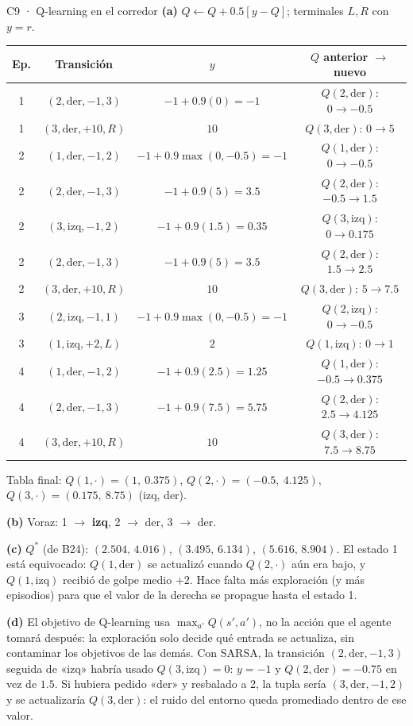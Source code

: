 \begin{solucion}{C9 · Q-learning en el corredor}
\textbf{(a)} $Q\leftarrow Q+0.5[y-Q]$; terminales $L,R$ con $y=r$.
\begin{center}\small
\begin{tabular}{c|c|c|c}
Ep. & Transición & $y$ & $Q$ anterior $\to$ nuevo\\\hline
1 & $(2,\text{der},-1,3)$ & $-1+0.9(0)=-1$ & $Q(2,\text{der})$: $0\to-0.5$\\
1 & $(3,\text{der},+10,R)$ & $10$ & $Q(3,\text{der})$: $0\to5$\\
2 & $(1,\text{der},-1,2)$ & $-1+0.9\max(0,-0.5)=-1$ & $Q(1,\text{der})$: $0\to-0.5$\\
2 & $(2,\text{der},-1,3)$ & $-1+0.9(5)=3.5$ & $Q(2,\text{der})$: $-0.5\to1.5$\\
2 & $(3,\text{izq},-1,2)$ & $-1+0.9(1.5)=0.35$ & $Q(3,\text{izq})$: $0\to0.175$\\
2 & $(2,\text{der},-1,3)$ & $-1+0.9(5)=3.5$ & $Q(2,\text{der})$: $1.5\to2.5$\\
2 & $(3,\text{der},+10,R)$ & $10$ & $Q(3,\text{der})$: $5\to7.5$\\
3 & $(2,\text{izq},-1,1)$ & $-1+0.9\max(0,-0.5)=-1$ & $Q(2,\text{izq})$: $0\to-0.5$\\
3 & $(1,\text{izq},+2,L)$ & $2$ & $Q(1,\text{izq})$: $0\to1$\\
4 & $(1,\text{der},-1,2)$ & $-1+0.9(2.5)=1.25$ & $Q(1,\text{der})$: $-0.5\to0.375$\\
4 & $(2,\text{der},-1,3)$ & $-1+0.9(7.5)=5.75$ & $Q(2,\text{der})$: $2.5\to4.125$\\
4 & $(3,\text{der},+10,R)$ & $10$ & $Q(3,\text{der})$: $7.5\to8.75$
\end{tabular}
\end{center}
Tabla final: $Q(1,\cdot)=(1,\ 0.375)$, $Q(2,\cdot)=(-0.5,\ 4.125)$, $Q(3,\cdot)=(0.175,\ 8.75)$ (izq, der).

\textbf{(b)} Voraz: 1 $\to$ \textbf{izq}, 2 $\to$ der, 3 $\to$ der.

\textbf{(c)} $Q^*$ (de B24): $(2.504,\,4.016)$, $(3.495,\,6.134)$, $(5.616,\,8.904)$. El estado 1 está equivocado: $Q(1,\text{der})$ se actualizó cuando
$Q(2,\cdot)$ aún era bajo, y $Q(1,\text{izq})$ recibió de golpe medio $+2$. Hace falta más exploración (y más episodios) para que el valor de la
derecha se propague hasta el estado 1.

\textbf{(d)} El objetivo de Q-learning usa $\max_{a'}Q(s',a')$, no la acción que el agente tomará después: la exploración solo decide qué
entrada se actualiza, sin contaminar los objetivos de las demás. Con SARSA, la transición $(2,\text{der},-1,3)$ seguida de «izq» habría usado
$Q(3,\text{izq})=0$: $y=-1$ y $Q(2,\text{der})=-0.75$ en vez de $1.5$. Si hubiera pedido «der» y resbalado a 2, la tupla sería
$(3,\text{der},-1,2)$ y se actualizaría $Q(3,\text{der})$: el ruido del entorno queda promediado dentro de ese valor.
\end{solucion}

